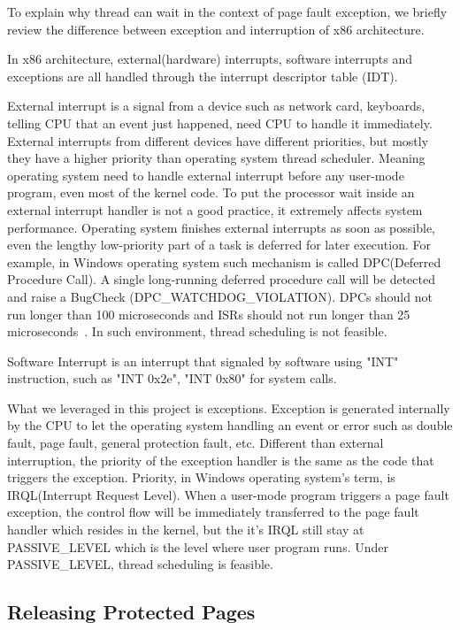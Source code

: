 To explain why thread can wait in the context of page fault exception, we briefly review the difference between exception and interruption of x86 architecture.

In x86 architecture, external(hardware) interrupts, software interrupts and exceptions are all handled through the interrupt descriptor table (IDT). 

External interrupt is a signal from a device such as network card, keyboards, telling CPU that an event just happened, need CPU to handle it immediately. External interrupts from different devices have different priorities, but mostly they have a higher priority than operating system thread scheduler. Meaning operating system need to handle external interrupt before any user-mode program, even most of the kernel code. To put the processor wait inside an external interrupt handler is not a good  practice, it extremely affects system performance. Operating system finishes external interrupts as soon as possible, even the lengthy low-priority part of a task is deferred for later execution. For example, in Windows operating system such mechanism is called DPC(Deferred Procedure Call). A single long-running deferred procedure call will be detected and raise a BugCheck (DPC\_WATCHDOG\_VIOLATION). DPCs should not run longer than 100 microseconds and ISRs should not run longer than 25 microseconds~\cite{msdnwatchdog}. In such environment, thread scheduling is not feasible.

Software Interrupt is an interrupt that signaled by software using "INT" instruction, such as "INT 0x2e", "INT 0x80" for system calls. 

What we leveraged in this project is exceptions. Exception is generated internally by the CPU to let the operating system handling an event or error such as double fault, page fault, general protection fault, etc. Different than external interruption, the priority of the exception handler is the same as the code that triggers the exception. Priority, in Windows operating system's term, is IRQL(Interrupt Request Level). When a user-mode program triggers a page fault exception, the control flow will be immediately transferred to the page fault handler which resides in the kernel, but the it's IRQL still stay at PASSIVE\_LEVEL which is the level where user program runs. Under PASSIVE\_LEVEL, thread scheduling is feasible.

\subsection{Releasing Protected Pages}

